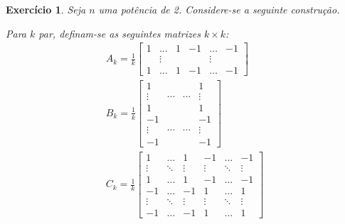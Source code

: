 \documentclass{article}
\newtheorem{ex}{Exercício}[section]
\begin{document}
\begin{ex}\label{exabc}
Seja $n$ uma potência de 2. Considere-se a seguinte construção.

Para $k$ par, definam-se as seguintes matrizes $k \times k$:
\begin{gather*}
A_k = \frac1k \begin{bmatrix}
1 & \dots & 1 & -1 & \dots & -1\\
& \vdots & & &\vdots &\\
1 & \dots & 1 & -1 & \dots & -1
\end{bmatrix}\\
B_k = \frac1k \begin{bmatrix}
1 & & & 1 \\
\vdots & \cdots & \cdots & \vdots \\
1 & & & 1\\
-1 & & & -1 \\
\vdots & \cdots & \cdots & \vdots \\
-1 & & & -1
\end{bmatrix}\\
C_k = \frac1k \begin{bmatrix}
1 & \dots & 1 & -1 & \dots & -1\\
\vdots & \ddots & \vdots & \vdots & \ddots & \vdots\\
1 & \dots & 1 & -1 & \dots & -1\\
-1 & \dots & -1 & 1 & \dots & 1\\
\vdots & \ddots & \vdots & \vdots & \ddots & \vdots\\
-1 & \dots & -1 & 1 & \dots & 1
\end{bmatrix}
\end{gather*}


\end{ex}
\end{document}
